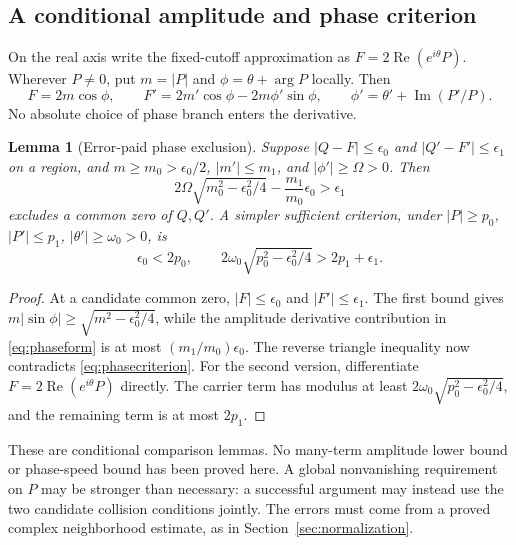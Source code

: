 \documentclass[11pt]{article}
\numberwithin{equation}{section}
\newtheorem{lemma}[theorem]{Lemma}
\theoremstyle{definition}
\theoremstyle{remark}
\DeclareMathOperator{\Rea}{Re}
\DeclareMathOperator{\Ima}{Im}
\begin{document}
\subsection{A conditional amplitude and phase criterion}
On the real axis write the fixed-cutoff approximation as
$F=2\Rea(e^{i\theta}P)$. Wherever $P\ne0$, put
$m=|P|$ and $\phi=\theta+\arg P$ locally. Then
\begin{equation}\label{eq:phaseform}
 F=2m\cos\phi,\qquad
 F'=2m'\cos\phi-2m\phi'\sin\phi,
 \qquad\phi'=\theta'+\Ima(P'/P).
\end{equation}
No absolute choice of phase branch enters the derivative.

\begin{lemma}[Error-paid phase exclusion]\label{lem:phase}
Suppose $|Q-F|\le\epsilon_0$ and $|Q'-F'|\le\epsilon_1$ on a
region, and
$m\ge m_0>\epsilon_0/2$, $|m'|\le m_1$, and $|\phi'|\ge\Omega>0$.
Then
\begin{equation}\label{eq:phasecriterion}
 2\Omega\sqrt{m_0^2-\epsilon_0^2/4}
       -\frac{m_1}{m_0}\epsilon_0>\epsilon_1
\end{equation}
excludes a common zero of $Q,Q'$.
A simpler sufficient criterion, under
$|P|\ge p_0$, $|P'|\le p_1$, $|\theta'|\ge\omega_0>0$, is
\begin{equation}\label{eq:carriercriterion}
 \epsilon_0<2p_0,\qquad
 2\omega_0\sqrt{p_0^2-\epsilon_0^2/4}>2p_1+\epsilon_1.
\end{equation}
\end{lemma}
\begin{proof}
At a candidate common zero, $|F|\le\epsilon_0$ and
$|F'|\le\epsilon_1$. The first bound gives
$m|\sin\phi|\ge\sqrt{m^2-\epsilon_0^2/4}$, while the amplitude
derivative contribution in \eqref{eq:phaseform} is at most
$(m_1/m_0)\epsilon_0$. The reverse triangle inequality now
contradicts \eqref{eq:phasecriterion}. For the second version,
differentiate $F=2\Rea(e^{i\theta}P)$ directly. The carrier term
has modulus at least
$2\omega_0\sqrt{p_0^2-\epsilon_0^2/4}$, and the remaining
term is at most $2p_1$.
\end{proof}
These are conditional comparison lemmas. No many-term amplitude
lower bound or phase-speed bound has been proved here. A global
nonvanishing requirement on $P$ may be stronger than necessary:
a successful argument may instead use the two candidate collision
conditions jointly. The errors must come from a proved complex
neighborhood estimate, as in Section~\ref{sec:normalization}.
\end{document}
